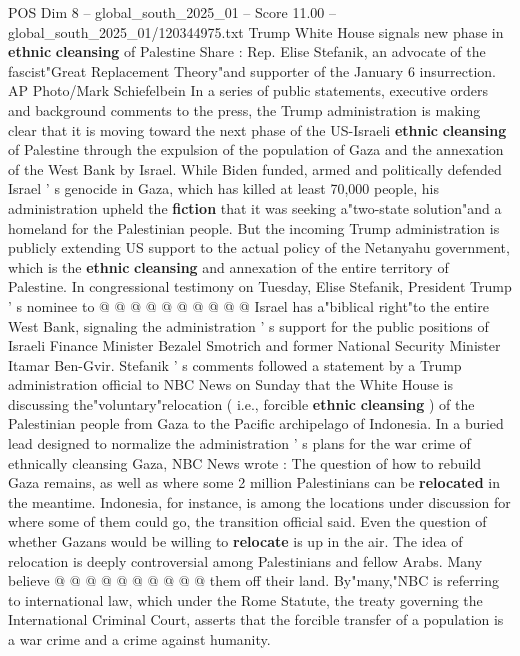 \begin{textsample}{POS Dim 8 – global\_south\_2025\_01 – Score 11.00 – global\_south\_2025\_01/120344975.txt}  \label{ex:f8_pos_112}
Trump White House signals new phase in \textbf{ethnic} \textbf{cleansing} of Palestine Share : Rep.
Elise Stefanik, an advocate of the fascist"Great Replacement Theory"and supporter of the January 6 insurrection.
AP Photo/Mark Schiefelbein In a series of public statements, executive orders and background comments to the press, the Trump administration is making clear that it is moving toward the next phase of the US-Israeli \textbf{ethnic} \textbf{cleansing} of Palestine through the expulsion of the population of Gaza and the annexation of the West Bank by Israel.
While Biden funded, armed and politically defended Israel ' s genocide in Gaza, which has killed at least 70,000 people, his administration upheld the \textbf{fiction} that it was seeking a"two-state solution"and a homeland for the Palestinian people.
But the incoming Trump administration is publicly extending US support to the actual policy of the Netanyahu government, which is the \textbf{ethnic} \textbf{cleansing} and annexation of the entire territory of Palestine.
In congressional testimony on Tuesday, Elise Stefanik, President Trump ' s nominee to @ @ @ @ @ @ @ @ @ @ Israel has a"biblical right"to the entire West Bank, signaling the administration ' s support for the public positions of Israeli Finance Minister Bezalel Smotrich and former National Security Minister Itamar Ben-Gvir.
Stefanik ' s comments followed a statement by a Trump administration official to NBC News on Sunday that the White House is discussing the"voluntary"relocation ( i.e., forcible \textbf{ethnic} \textbf{cleansing} ) of the Palestinian people from Gaza to the Pacific archipelago of Indonesia.
In a buried lead designed to normalize the administration ' s plans for the war crime of ethnically cleansing Gaza, NBC News wrote : The question of how to rebuild Gaza remains, as well as where some 2 million Palestinians can be \textbf{relocated} in the meantime.
Indonesia, for instance, is among the locations under discussion for where some of them could go, the transition official said.
Even the question of whether Gazans would be willing to \textbf{relocate} is up in the air.
The idea of relocation is deeply controversial among Palestinians and fellow Arabs.
Many believe @ @ @ @ @ @ @ @ @ @ them off their land.
By"many,"NBC is referring to international law, which under the Rome Statute, the treaty governing the International Criminal Court, asserts that the forcible transfer of a population is a war crime and a crime against humanity.

\end{textsample}
